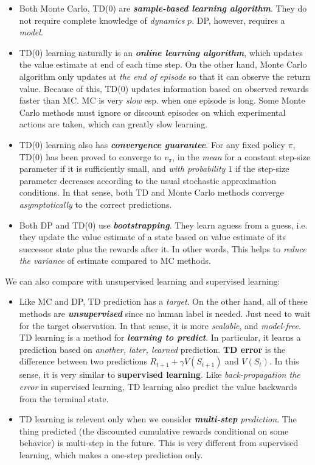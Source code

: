 \documentclass[11pt]{article}
\begin{document}
\begin{itemize}
\item Both Monte Carlo, TD(0) are \textbf{\emph{sample-based learning algorithm}}. They do not require complete knowledge of \emph{dynamics} $p$.  DP, however, requires a \emph{model}. 

\item TD($0$) learning naturally is an \textbf{\emph{online learning algorithm}}, which updates the value estimate at end of each time step. On the other hand, Monte Carlo algorithm only updates at\emph{ the end of episode} so that it can observe the return value. Because of this, TD($0$) updates information based on observed rewards faster than MC. MC is very \emph{slow} esp. when one episode is long. Some Monte Carlo methods must ignore or discount episodes on which experimental actions are taken, which can greatly slow learning.

\item TD(0) learning also has \emph{\textbf{convergence guarantee}}. For any fixed policy $\pi$, TD($0$) has been proved to converge to $v_{\pi}$, in the \emph{mean} for a constant step-size parameter if it is sufficiently small, and \emph{with probability $1$} if the step-size parameter decreases according to the usual stochastic approximation conditions. In that sense, both TD and Monte Carlo methods converge \emph{asymptotically} to the correct predictions. 

\item Both DP and TD(0) use \emph{\textbf{bootstrapping}}. They learn aguess from a guess, i.e. they update the value estimate of a state based on value estimate of its successor state plus the rewards after it. In other words, This helps to \emph{reduce the variance} of estimate compared to MC methods. 
\end{itemize}

We can also compare with unsupervised learning and supervised learning:
\begin{itemize}
\item Like MC and DP, TD prediction has a \emph{target}. On the other hand, all of these methods are \emph{\textbf{unsupervised}} since no human label is needed. Just need to wait for the target observation. In that sense, it is more \emph{scalable}, and \emph{model-free}. TD learning is a method for \emph{\textbf{learning to predict}}. In particular, it learns a prediction based on \emph{another, later, learned} prediction.  \textbf{TD error} is the difference between two predictions $R_{t+1} + \gamma V(S_{t+1})$ and $V(S_{t})$. In this sense, it is very similar to \textbf{supervised learning}. Like \emph{back-propagation the error} in supervised learning, TD learning also predict the value backwards from the terminal state. 

\item TD learning is relevent only when we consider \emph{\textbf{multi-step} prediction}.  The thing predicted (the discounted cumulative rewards conditional on some behavior) is multi-step in the future. This is very different from supervised learning, which makes a one-step prediction only. 
\end{itemize}
\end{document}
